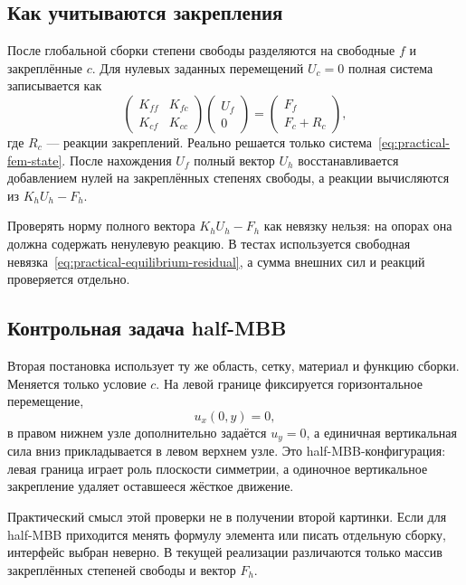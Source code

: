 \subsection{Как учитываются закрепления}
\label{subsec:practical-v02-dirichlet}

После глобальной сборки степени свободы разделяются на свободные $f$ и закреплённые $c$. Для нулевых заданных перемещений $U_c=0$ полная система записывается как
\begin{equation}
 \begin{pmatrix}
  K_{ff} & K_{fc}\\
  K_{cf} & K_{cc}
 \end{pmatrix}
 \begin{pmatrix}
  U_f\\
  0
 \end{pmatrix}
 =
 \begin{pmatrix}
  F_f\\
  F_c+R_c
 \end{pmatrix},
\end{equation}
где $R_c$ --- реакции закреплений. Реально решается только система~\eqref{eq:practical-fem-state}. После нахождения $U_f$ полный вектор $U_h$ восстанавливается добавлением нулей на закреплённых степенях свободы, а реакции вычисляются из $K_hU_h-F_h$.

Проверять норму полного вектора $K_hU_h-F_h$ как невязку нельзя: на опорах она должна содержать ненулевую реакцию. В тестах используется свободная невязка~\eqref{eq:practical-equilibrium-residual}, а сумма внешних сил и реакций проверяется отдельно.

\subsection{Контрольная задача half-MBB}
\label{subsec:practical-v02-mbb}

Вторая постановка использует ту же область, сетку, материал и функцию сборки. Меняется только условие $c$. На левой границе фиксируется горизонтальное перемещение,
\begin{equation}
 u_x(0,y)=0,
\end{equation}
в правом нижнем узле дополнительно задаётся $u_y=0$, а единичная вертикальная сила вниз прикладывается в левом верхнем узле. Это half-MBB-конфигурация: левая граница играет роль плоскости симметрии, а одиночное вертикальное закрепление удаляет оставшееся жёсткое движение.

Практический смысл этой проверки не в получении второй картинки. Если для half-MBB приходится менять формулу элемента или писать отдельную сборку, интерфейс выбран неверно. В текущей реализации различаются только массив закреплённых степеней свободы и вектор $F_h$.

